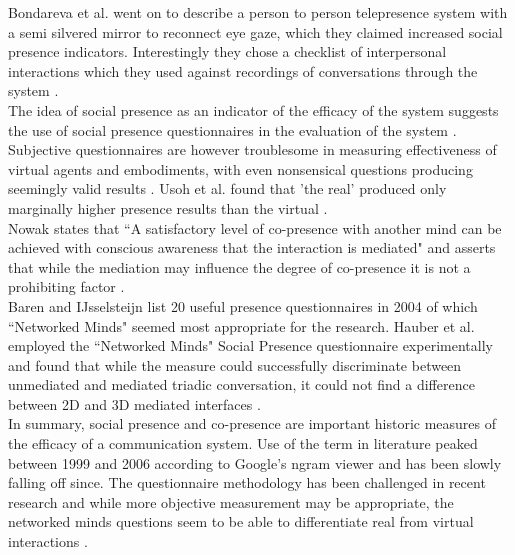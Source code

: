 			     
            Bondareva et al. went on to describe a person to person telepresence system with a semi silvered mirror to reconnect eye gaze, which they claimed increased social presence indicators. Interestingly they chose a checklist of interpersonal interactions which they used against recordings of conversations through the system \cite{Bondareva2004}.  \\
            The idea of social presence as an indicator of the efficacy of the system suggests the use of social presence questionnaires in the evaluation of the system \cite{Biocca2003}.  Subjective questionnaires are however troublesome in measuring effectiveness of virtual agents and embodiments, with even nonsensical questions producing seemingly valid results \cite{Slater2004}. Usoh et al. found that 'the real' produced only marginally higher presence results than the virtual \cite{Usoh2000a}.\\
            Nowak states that ``A satisfactory level of co-presence with another mind can be achieved with conscious awareness that the interaction is mediated" and asserts that while the mediation may influence the degree of co-presence it is not a prohibiting factor \cite{Nowak2001}.\\ 
            Baren and IJsselsteijn \cite{Baren, Harms2004} list 20 useful presence questionnaires in 2004 of which ``Networked Minds" seemed most appropriate for the research.
            Hauber et al. employed the ``Networked Minds" Social Presence questionnaire experimentally and found that while the measure could successfully discriminate between unmediated and mediated triadic conversation, it could not find a difference between 2D and 3D mediated interfaces \cite{Hauber2005, Gunawardena1997}.
            \\In summary, social presence and co-presence are important historic measures of the efficacy of a communication system. Use of the term in literature peaked between 1999 and 2006 according to Google's ngram viewer and has been slowly falling off since. The questionnaire methodology has been challenged in recent research and while more objective measurement may be appropriate, the networked minds questions seem to be able to differentiate real from virtual interactions \cite{Harms2004}.
 
